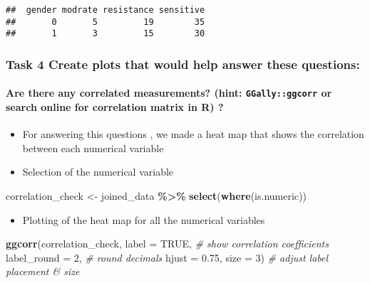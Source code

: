 \documentclass[
]{article}
\newenvironment{Shaded}{\begin{snugshade}}{\end{snugshade}}
\newcommand{\AttributeTok}[1]{\textcolor[rgb]{0.13,0.29,0.53}{#1}}
\newcommand{\CommentTok}[1]{\textcolor[rgb]{0.56,0.35,0.01}{\textit{#1}}}
\newcommand{\ConstantTok}[1]{\textcolor[rgb]{0.56,0.35,0.01}{#1}}
\newcommand{\DecValTok}[1]{\textcolor[rgb]{0.00,0.00,0.81}{#1}}
\newcommand{\FloatTok}[1]{\textcolor[rgb]{0.00,0.00,0.81}{#1}}
\newcommand{\FunctionTok}[1]{\textcolor[rgb]{0.13,0.29,0.53}{\textbf{#1}}}
\newcommand{\NormalTok}[1]{#1}
\newcommand{\OtherTok}[1]{\textcolor[rgb]{0.56,0.35,0.01}{#1}}
\newcommand{\SpecialCharTok}[1]{\textcolor[rgb]{0.81,0.36,0.00}{\textbf{#1}}}
\providecommand{\tightlist}{%
  \setlength{\itemsep}{0pt}\setlength{\parskip}{0pt}}
\begin{document}
\begin{verbatim}
##  gender modrate resistance sensitive
##       0       5         19        35
##       1       3         15        30
\end{verbatim}

\subsubsection{Task 4 Create plots that would help answer these
questions:}\label{task-4-create-plots-that-would-help-answer-these-questions}

\paragraph{\texorpdfstring{Are there any correlated measurements? (hint:
\texttt{GGally::ggcorr} or search online for correlation matrix in R)
?}{Are there any correlated measurements? (hint: GGally::ggcorr or search online for correlation matrix in R) ?}}\label{are-there-any-correlated-measurements-hint-ggallyggcorr-or-search-online-for-correlation-matrix-in-r}

\begin{itemize}
\item
  For answering this questions , we made a heat map that shows the
  correlation between each numerical variable
\item
  Selection of the numerical variable
\end{itemize}

\begin{Shaded}
\begin{Highlighting}[]
\NormalTok{correlation\_check }\OtherTok{\textless{}{-}}\NormalTok{ joined\_data }\SpecialCharTok{\%\textgreater{}\%} 
  \FunctionTok{select}\NormalTok{(}\FunctionTok{where}\NormalTok{(is.numeric))}
\end{Highlighting}
\end{Shaded}

\begin{itemize}
\tightlist
\item
  Plotting of the heat map for all the numerical variables
\end{itemize}

\begin{Shaded}
\begin{Highlighting}[]
\FunctionTok{ggcorr}\NormalTok{(correlation\_check, }
       \AttributeTok{label =} \ConstantTok{TRUE}\NormalTok{,                }\CommentTok{\# show correlation coefficients}
       \AttributeTok{label\_round =} \DecValTok{2}\NormalTok{,             }\CommentTok{\# round decimals}
       \AttributeTok{hjust =} \FloatTok{0.75}\NormalTok{, }\AttributeTok{size =} \DecValTok{3}\NormalTok{)      }\CommentTok{\# adjust label placement \& size}
\end{Highlighting}
\end{Shaded}
\end{document}

